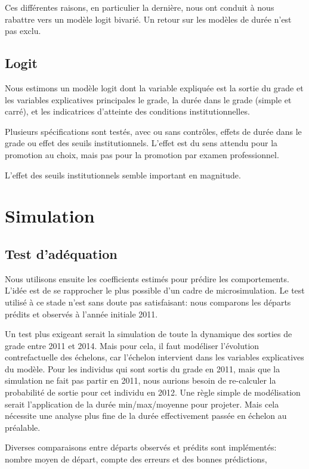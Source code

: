 \documentclass[11pt,a4paper]{article}
\begin{document}
Ces différentes raisons, en particulier la dernière, nous ont conduit à nous rabattre vers un modèle logit bivarié. Un retour sur les modèles de durée n'est pas exclu. 

\subsection*{Logit} 

Nous estimons un modèle logit dont la variable expliquée est la sortie du grade et les variables explicatives principales le grade, la durée dans le grade (simple et carré), et les indicatrices d'atteinte des conditions institutionnelles. 

Plusieurs spécifications sont testés, avec ou sans contrôles, effets de durée dans le grade ou effet des seuils institutionnels. 
L'effet est du sens attendu pour la promotion au choix, mais pas pour la promotion par examen professionnel. 

L'effet des seuils institutionnels semble important en magnitude. 

\section{Simulation}


\subsection*{Test d'adéquation} 

Nous utilisons ensuite les coefficients estimés pour prédire les comportements. L'idée est de se rapprocher le plus possible d'un cadre de microsimulation. Le test utilisé à ce stade n'est sans doute pas satisfaisant: nous comparons les départs prédits et observés à l'année initiale 2011. 

Un test plus exigeant serait la simulation de toute la dynamique des sorties de grade entre 2011 et 2014. Mais pour cela, il faut modéliser l'évolution contrefactuelle des échelons, car l'échelon intervient dans les variables explicatives du modèle. Pour les individus qui sont sortis du grade en 2011, mais que la simulation ne fait pas partir en 2011, nous aurions besoin de re-calculer la probabilité de sortie pour cet individu en 2012. Une règle simple de modélisation serait l'application de la durée min/max/moyenne pour projeter. Mais cela nécessite une analyse plus fine de la durée effectivement passée en échelon au préalable. 

Diverses comparaisons entre départs observés et prédits sont implémentés: nombre moyen de départ, compte des erreurs et des bonnes prédictions, 
\end{document}
